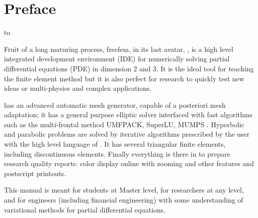 \documentclass[a4paper,twoside,12pt]{book}
\begin{document}
\section*{Preface}

\hbox to 

Fruit of a long maturing process, freefem, in its last avatar, \freefempp, is a high level integrated development environment (IDE)  for numerically solving partial differential equations (PDE) in dimension 2 and 3.  It is the ideal tool for teaching the finite element method but it is also perfect for research to quickly test new ideas or multi-physics and complex applications.


\medskip

\freefempp has an advanced automatic mesh generator, capable of a posteriori mesh adaptation; it has a general purpose elliptic solver  interfaced with fast algorithms such as the multi-frontal method UMFPACK, SuperLU, MUMPS . Hyperbolic and parabolic problems are solved by iterative algorithms prescribed by the user with the high level language of \freefempp. It has several triangular  finite elements, including discontinuous elements.  Finally everything is there in \freefempp to prepare research quality reports: color display online with zooming and other features and postscript printouts.
\medskip

This manual is meant for students at Master level, for  researchers at any level, and for engineers (including financial engineering) with some understanding of variational methods for partial differential equations.
\end{document}
